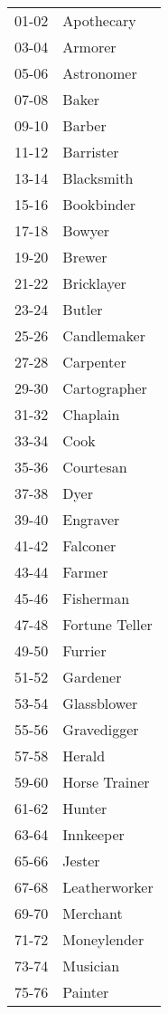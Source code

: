\begin{multicols}{2}
\begin{center}
{
\begin{xtabular}{|l|l|}
01-02 & Apothecary \\
03-04 & Armorer \\
05-06 & Astronomer \\
07-08 & Baker \\
09-10 & Barber \\
11-12 & Barrister \\
13-14 & Blacksmith \\
15-16 & Bookbinder \\
17-18 & Bowyer \\
19-20 & Brewer \\
21-22 & Bricklayer \\
23-24 & Butler \\
25-26 & Candlemaker \\
27-28 & Carpenter \\
29-30 & Cartographer \\
31-32 & Chaplain \\
33-34 & Cook \\
35-36 & Courtesan \\
37-38 & Dyer \\
39-40 & Engraver \\
41-42 & Falconer \\
43-44 & Farmer \\
45-46 & Fisherman \\
47-48 & Fortune Teller \\
49-50 & Furrier \\
51-52 & Gardener \\
53-54 & Glassblower \\
55-56 & Gravedigger \\
57-58 & Herald \\
59-60 & Horse Trainer \\
61-62 & Hunter \\
63-64 & Innkeeper \\
65-66 & Jester \\
67-68 & Leatherworker \\
69-70 & Merchant \\
71-72 & Moneylender \\
73-74 & Musician \\
75-76 & Painter \\

\end{xtabular}}
\end{center}
\end{multicols}
